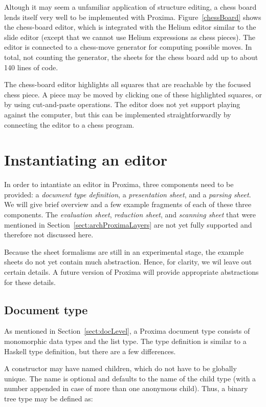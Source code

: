 Altough it may seem a unfamiliar application of structure editing, a chess board lends itself very well to be implemented with Proxima.  Figure~\ref{chessBoard} shows the chess-board editor, which is integrated with the Helium editor similar to the slide editor (except that we cannot use Helium expressions as chess pieces). The editor is connected to a chess-move generator for computing possible moves. In total, not counting the generator, the sheets for the chess board add up to about 140 lines of code.


The chess-board editor highlights all squares that are reachable by the focused chess piece. A piece may be moved by clicking one of these highlighted squares, or by using cut-and-paste operations. The editor does not yet support playing against the computer, but this can be implemented straightforwardly by connecting the editor to a chess program. 


%																
%																
%																
\section{Instantiating an editor} \label{sect:instantiating}

In order to intantiate an editor in Proxima, three components need to be provided: a {\em document type definition}, a {\em presentation sheet}, and a {\em parsing sheet}. We will give brief overview and a few example fragments of each of these three components. The {\em evaluation sheet}, {\em reduction sheet}, and {\em scanning sheet} that were mentioned in Section~\ref{sect:archProximaLayers} are not yet fully supported and therefore not discussed here.

Because the sheet formalisms are still in an experimental stage, the example sheets do not yet contain much abstraction. Hence, for clarity, we wil leave out certain details. A future version of Proxima will provide appropriate abstractions for these details. 

\subsection{Document type}

As mentioned in Section~\ref{sect:docLevel}, a Proxima document type consists of monomorphic data types and the list type. The type definition is similar to a Haskell type definition, but there are a few differences. 

A constructor may have named children, which do not have to be globally unique. The name is optional and defaults to the name of the child type (with a number appended in case of more than one anonymous child). Thus, a binary tree type may be defined as:

